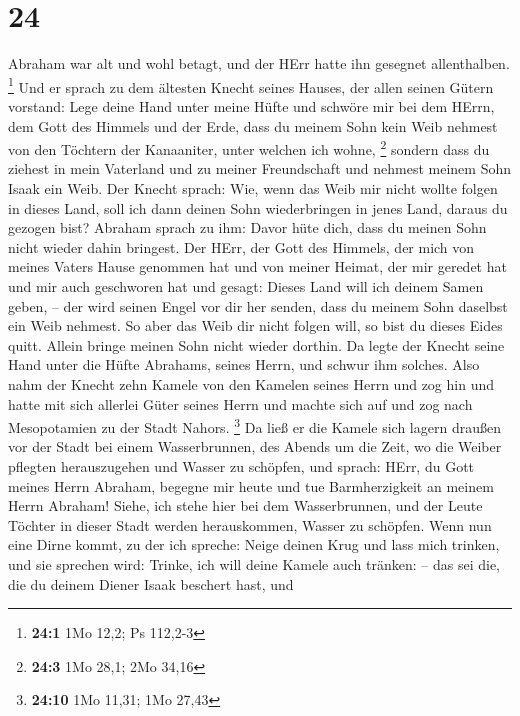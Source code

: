 \hypertarget{section-5}{%
\section{24}\label{section-5}}

 Abraham war alt und wohl betagt, und der HErr hatte ihn
gesegnet allenthalben. \footnote{\textbf{24:1} 1Mo 12,2; Ps 112,2-3}
 Und er sprach zu dem ältesten Knecht seines Hauses, der
allen seinen Gütern vorstand: Lege deine Hand unter meine Hüfte
 und schwöre mir bei dem HErrn, dem Gott des Himmels und der
Erde, dass du meinem Sohn kein Weib nehmest von den Töchtern der
Kanaaniter, unter welchen ich wohne, \footnote{\textbf{24:3} 1Mo 28,1;
  2Mo 34,16}  sondern dass du ziehest in mein Vaterland und
zu meiner Freundschaft und nehmest meinem Sohn Isaak ein Weib.
 Der Knecht sprach: Wie, wenn das Weib mir nicht wollte
folgen in dieses Land, soll ich dann deinen Sohn wiederbringen in jenes
Land, daraus du gezogen bist?  Abraham sprach zu ihm: Davor
hüte dich, dass du meinen Sohn nicht wieder dahin bringest. 
Der HErr, der Gott des Himmels, der mich von meines Vaters Hause
genommen hat und von meiner Heimat, der mir geredet hat und mir auch
geschworen hat und gesagt: Dieses Land will ich deinem Samen geben, --
der wird seinen Engel vor dir her senden, dass du meinem Sohn daselbst
ein Weib nehmest.  So aber das Weib dir nicht folgen will,
so bist du dieses Eides quitt. Allein bringe meinen Sohn nicht wieder
dorthin.  Da legte der Knecht seine Hand unter die Hüfte
Abrahams, seines Herrn, und schwur ihm solches.  Also nahm
der Knecht zehn Kamele von den Kamelen seines Herrn und zog hin und
hatte mit sich allerlei Güter seines Herrn und machte sich auf und zog
nach Mesopotamien zu der Stadt Nahors. \footnote{\textbf{24:10} 1Mo
  11,31; 1Mo 27,43}  Da ließ er die Kamele sich lagern
draußen vor der Stadt bei einem Wasserbrunnen, des Abends um die Zeit,
wo die Weiber pflegten herauszugehen und Wasser zu schöpfen,
 und sprach: HErr, du Gott meines Herrn Abraham, begegne
mir heute und tue Barmherzigkeit an meinem Herrn Abraham! 
Siehe, ich stehe hier bei dem Wasserbrunnen, und der Leute Töchter in
dieser Stadt werden herauskommen, Wasser zu schöpfen.  Wenn
nun eine Dirne kommt, zu der ich spreche: Neige deinen Krug und lass
mich trinken, und sie sprechen wird: Trinke, ich will deine Kamele auch
tränken: -- das sei die, die du deinem Diener Isaak beschert hast, und

